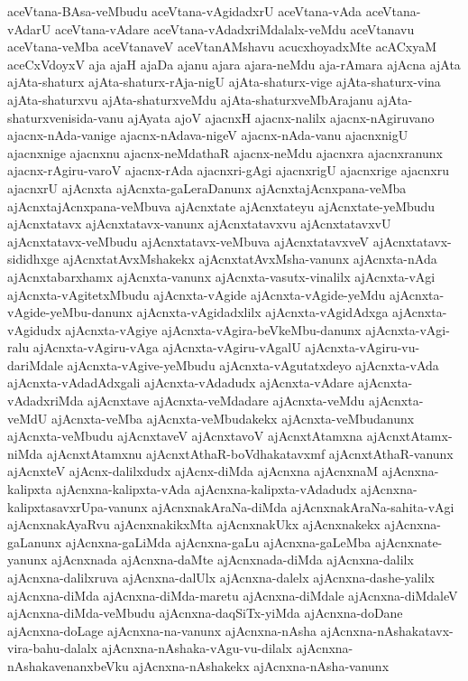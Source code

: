 {aceVtana-BAsa-veMbudu
aceVtana-vAgidadxrU
aceVtana-vAda
aceVtana-vAdarU
aceVtana-vAdare
aceVtana-vAdadxriMdalalx-veMdu
aceVtanavu
aceVtana-veMba
aceVtanaveV
aceVtanAMshavu
acucxhoyadxMte
acACxyaM
aceCxVdoyxV
aja
ajaH
ajaDa
ajanu
ajara
ajara-neMdu
aja-rAmara
ajAcna
ajAta
ajAta-shaturx
ajAta-shaturx-rAja-nigU
ajAta-shaturx-vige
ajAta-shaturx-vina
ajAta-shaturxvu
ajAta-shaturxveMdu
ajAta-shaturxveMbArajanu
ajAta-shaturxvenisida-vanu
ajAyata
ajoV
ajacnxH
ajacnx-nalilx
ajacnx-nAgiruvano
ajacnx-nAda-vanige
ajacnx-nAdava-nigeV
ajacnx-nAda-vanu
ajacnxnigU
ajacnxnige
ajacnxnu
ajacnx-neMdathaR
ajacnx-neMdu
ajacnxra
ajacnxranunx
ajacnx-rAgiru-varoV
ajacnx-rAda
ajacnxri-gAgi
ajacnxrigU
ajacnxrige
ajacnxru
ajacnxrU
ajAcnxta
ajAcnxta-gaLeraDanunx
ajAcnxtajAcnxpana-veMba
ajAcnxtajAcnxpana-veMbuva
ajAcnxtate
ajAcnxtateyu
ajAcnxtate-yeMbudu
ajAcnxtatavx
ajAcnxtatavx-vanunx
ajAcnxtatavxvu
ajAcnxtatavxvU
ajAcnxtatavx-veMbudu
ajAcnxtatavx-veMbuva
ajAcnxtatavxveV
ajAcnxtatavx-sididhxge
ajAcnxtatAvxMshakekx
ajAcnxtatAvxMsha-vanunx
ajAcnxta-nAda
ajAcnxtabarxhamx
ajAcnxta-vanunx
ajAcnxta-vasutx-vinalilx
ajAcnxta-vAgi
ajAcnxta-vAgitetxMbudu
ajAcnxta-vAgide
ajAcnxta-vAgide-yeMdu
ajAcnxta-vAgide-yeMbu-danunx
ajAcnxta-vAgidadxlilx
ajAcnxta-vAgidAdxga
ajAcnxta-vAgidudx
ajAcnxta-vAgiye
ajAcnxta-vAgira-beVkeMbu-danunx
ajAcnxta-vAgi-ralu
ajAcnxta-vAgiru-vAga
ajAcnxta-vAgiru-vAgalU
ajAcnxta-vAgiru-vu-dariMdale
ajAcnxta-vAgive-yeMbudu
ajAcnxta-vAgutatxdeyo
ajAcnxta-vAda
ajAcnxta-vAdadAdxgali
ajAcnxta-vAdadudx
ajAcnxta-vAdare
ajAcnxta-vAdadxriMda
ajAcnxtave
ajAcnxta-veMdadare
ajAcnxta-veMdu
ajAcnxta-veMdU
ajAcnxta-veMba
ajAcnxta-veMbudakekx
ajAcnxta-veMbudanunx
ajAcnxta-veMbudu
ajAcnxtaveV
ajAcnxtavoV
ajAcnxtAtamxna
ajAcnxtAtamx-niMda
ajAcnxtAtamxnu
ajAcnxtAthaR-boVdhakatavxmf
ajAcnxtAthaR-vanunx
ajAcnxteV
ajAcnx-dalilxdudx
ajAcnx-diMda
ajAcnxna
ajAcnxnaM
ajAcnxna-kalipxta
ajAcnxna-kalipxta-vAda
ajAcnxna-kalipxta-vAdadudx
ajAcnxna-kalipxtasavxrUpa-vanunx
ajAcnxnakAraNa-diMda
ajAcnxnakAraNa-sahita-vAgi
ajAcnxnakAyaRvu
ajAcnxnakikxMta
ajAcnxnakUkx
ajAcnxnakekx
ajAcnxna-gaLanunx
ajAcnxna-gaLiMda
ajAcnxna-gaLu
ajAcnxna-gaLeMba
ajAcnxnate-yanunx
ajAcnxnada
ajAcnxna-daMte
ajAcnxnada-diMda
ajAcnxna-dalilx
ajAcnxna-dalilxruva
ajAcnxna-dalUlx
ajAcnxna-dalelx
ajAcnxna-dashe-yalilx
ajAcnxna-diMda
ajAcnxna-diMda-maretu
ajAcnxna-diMdale
ajAcnxna-diMdaleV
ajAcnxna-diMda-veMbudu
ajAcnxna-daqSiTx-yiMda
ajAcnxna-doDane
ajAcnxna-doLage
ajAcnxna-na-vanunx
ajAcnxna-nAsha
ajAcnxna-nAshakatavx-vira-bahu-dalalx
ajAcnxna-nAshaka-vAgu-vu-dilalx
ajAcnxna-nAshakavenanxbeVku
ajAcnxna-nAshakekx
ajAcnxna-nAsha-vanunx
}
